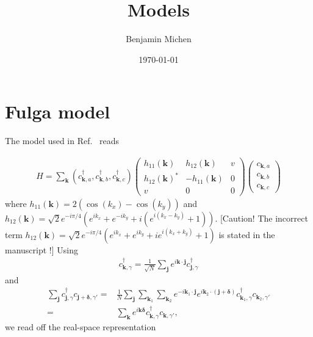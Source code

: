 \documentclass[english]{scrartcl}
\title{Models}
\author{Benjamin Michen}
\date{\today}
\begin{document}
\maketitle
{
\hypersetup{linkcolor=black}
\tableofcontents
}

\newpage

\section{Fulga model}
The model used in Ref.~\cite{Fulga_Bergholtz} reads

\begin{align}
H = \sum_{\bm k} (c^\dagger_{\bm{k},  a}, c^\dagger_{\bm{k},  b}, c^\dagger_{\bm{k},  c})
\begin{pmatrix} 
h_{11}(\bm k) & h_{12}(\bm k) & v \\
h_{12}(\bm k) ^*&  -h_{11}(\bm k) & 0 \\
v & 0 & 0 
\end{pmatrix}
\begin{pmatrix}
c_{\bm{k},  a}\\
c_{\bm{k},  b}\\
c_{\bm{k},  c}
\end{pmatrix}
\end{align}
where $h_{11}(\bm k) = 2(\cos(k_x) - \cos(k_y))$ and $h_{12}(\bm k) = \sqrt{2} e^{- i \pi /4} (e^{i k_x} + e^{-i k_y} + i \left(e^{i (k_x - k_y)} + 1 \right)) $. {\color{red} [Caution! The incorrect term $h_{12}(\bm k) = \sqrt{2} e^{- i \pi /4} (e^{i k_x} + e^{i k_y} + i e^{i (k_x + k_y)} + 1) $ is stated in the manuscript \cite{Fulga_Bergholtz}!]} Using
\begin{align*}
c^\dagger_{\bm{k}, \gamma}  = \frac{1}{\sqrt{N}} \sum_{\bm j } e^{i \bm k \cdot \bm j}  c^\dagger_{\bm j, \gamma}
\end{align*}
and
\begin{align*}
\sum_{\bm j } c^\dagger_{\bm{j}, \gamma} c_{\bm{j} + \bm \delta, \gamma'}   =& \frac{1}{N} \sum_{\bm j} \sum_{\bm k_1} \sum_{\bm k_2}  e^{-i \bm k_1 \cdot \bm j }   e^{i \bm k_2 \cdot (\bm j + \bm \delta) }  c^\dagger_{\bm k_1, \gamma} c_{\bm k_2, \gamma'} \\
=& \sum_{\bm k} e^{i \bm k \bm \delta} c^\dagger_{\bm k, \gamma} c_{\bm k, \gamma'},
\end{align*}
we read off the real-space representation
\end{document}
